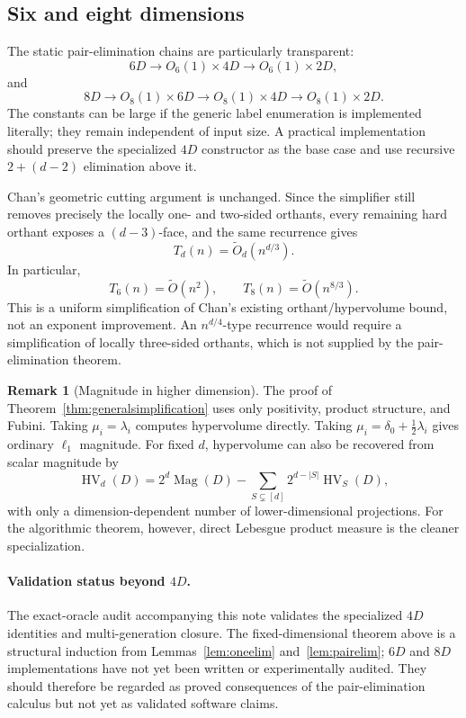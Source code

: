 \documentclass[12pt,a4paper]{article}
\theoremstyle{definition}
\newtheorem{remark}[theorem]{Remark}
\newcommand{\HV}{\operatorname{HV}}
\newcommand{\Mag}{\operatorname{Mag}}
\newcommand{\1}{\mathbf 1}
\begin{document}
\subsection{Six and eight dimensions}

The static pair-elimination chains are particularly transparent:
\[
6D\longrightarrow O_6(1)\times4D\longrightarrow O_6(1)\times2D,
\]
and
\[
8D\longrightarrow O_8(1)\times6D\longrightarrow O_8(1)\times4D\longrightarrow O_8(1)\times2D.
\]
The constants can be large if the generic label enumeration is implemented literally; they remain independent of input size.  A practical implementation should preserve the specialized $4D$ constructor as the base case and use recursive $2+(d-2)$ elimination above it.

Chan's geometric cutting argument is unchanged.  Since the simplifier still removes precisely the locally one- and two-sided orthants, every remaining hard orthant exposes a $(d-3)$-face, and the same recurrence gives
\begin{equation}
\boxed{T_d(n)=\widetilde O_d(n^{d/3}).}                         \label{eq:generaltime}
\end{equation}
In particular,
\[
T_6(n)=\widetilde O(n^2),\qquad T_8(n)=\widetilde O(n^{8/3}).
\]
This is a uniform simplification of Chan's existing orthant/hypervolume bound, not an exponent improvement.  An $n^{d/4}$-type recurrence would require a simplification of locally three-sided orthants, which is not supplied by the pair-elimination theorem.

\begin{remark}[Magnitude in higher dimension]
The proof of Theorem~\ref{thm:generalsimplification} uses only positivity, product structure, and Fubini.  Taking $\mu_i=\lambda_i$ computes hypervolume directly.  Taking $\mu_i=\delta_0+\tfrac12\lambda_i$ gives ordinary $\ell_1$ magnitude.  For fixed $d$, hypervolume can also be recovered from scalar magnitude by
\[
\HV_d(D)=2^d\Mag(D)-\sum_{S\subsetneq[d]}2^{d-|S|}\HV_S(D),
\]
with only a dimension-dependent number of lower-dimensional projections.  For the algorithmic theorem, however, direct Lebesgue product measure is the cleaner specialization.
\end{remark}

\paragraph{Validation status beyond $4D$.}
The exact-oracle audit accompanying this note validates the specialized $4D$ identities and multi-generation closure.  The fixed-dimensional theorem above is a structural induction from Lemmas~\ref{lem:oneelim} and~\ref{lem:pairelim}; $6D$ and $8D$ implementations have not yet been written or experimentally audited.  They should therefore be regarded as proved consequences of the pair-elimination calculus but not yet as validated software claims.
\end{document}
